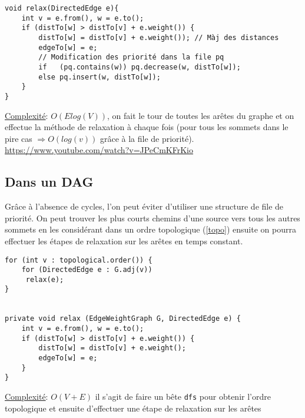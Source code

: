 \documentclass[10pt]{article}
\begin{document}
\begin{verbatim}
void relax(DirectedEdge e){
	int v = e.from(), w = e.to();
	if (distTo[w] > distTo[v] + e.weight()) {
		distTo[w] = distTo[v] + e.weight()); // Màj des distances
		edgeTo[w] = e;
		// Modification des priorité dans la file pq
		if   (pq.contains(w)) pq.decrease(w, distTo[w]); 
		else pq.insert(w, distTo[w]);
	}
}
\end{verbatim}

\underline{Complexité}: $O(Elog(V))$, on fait le tour de toutes les arêtes du graphe et on effectue la méthode de relaxation à chaque fois (pour tous les sommets dans le pire cas $\Rightarrow O(log(v))$ grâce à la file de priorité).
\\\url{https://www.youtube.com/watch?v=JPeCmKFrKio}

\subsection{Dans un DAG}
Grâce à l'absence de cycles, l'on peut éviter d'utiliser une structure de file de priorité. On peut trouver les plus courts chemins d'une source vers tous les autres sommets en les considérant dans un ordre topologique (\ref{topo}) ensuite on pourra effectuer les étapes de relaxation sur les arêtes en temps constant.

\begin{verbatim}
for (int v : topological.order()) {
    for (DirectedEdge e : G.adj(v))
	 relax(e);
}


private void relax (EdgeWeightGraph G, DirectedEdge e) {
    int v = e.from(), w = e.to();
    if (distTo[w] > distTo[v] + e.weight()) {
        distTo[w] = distTo[v] + e.weight();
        edgeTo[w] = e;
    }
}

\end{verbatim}
\underline{Complexité}: $O(V + E)$ il s'agit de faire un bête \verb|dfs| pour obtenir l'ordre topologique et ensuite d'effectuer une étape de relaxation sur les arêtes
\end{document}
